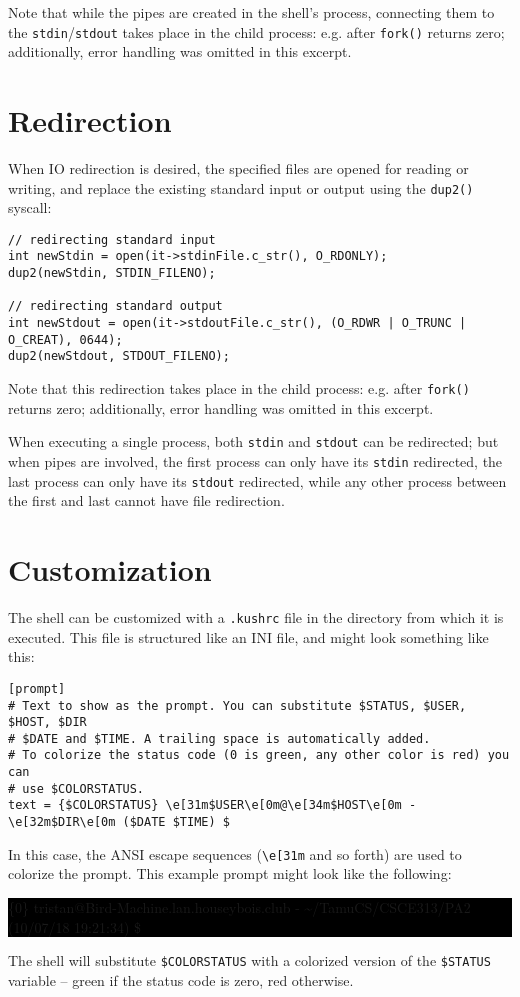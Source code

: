 \documentclass[10pt]{article}
\begin{document}
Note that while the pipes are created in the shell's process, connecting them to the \texttt{stdin}/\texttt{stdout} takes place in the child process: e.g. after \texttt{fork()} returns zero; additionally, error handling was omitted in this excerpt.

\section{Redirection}
When IO redirection is desired, the specified files are opened for reading or writing, and replace the existing standard input or output using the \texttt{dup2()} syscall:

\begin{verbatim}
// redirecting standard input
int newStdin = open(it->stdinFile.c_str(), O_RDONLY);
dup2(newStdin, STDIN_FILENO);

// redirecting standard output
int newStdout = open(it->stdoutFile.c_str(), (O_RDWR | O_TRUNC | O_CREAT), 0644);
dup2(newStdout, STDOUT_FILENO);
\end{verbatim}

Note that this redirection takes place in the child process: e.g. after \texttt{fork()} returns zero; additionally, error handling was omitted in this excerpt.

When executing a single process, both \texttt{stdin} and \texttt{stdout} can be redirected; but when pipes are involved, the first process can only have its \texttt{stdin} redirected, the last process can only have its \texttt{stdout} redirected, while any other process between the first and last cannot have file redirection.

\section{Customization}
The shell can be customized with a \texttt{.kushrc} file in the directory from which it is executed. This file is structured like an INI file, and might look something like this:

\begin{verbatim}
[prompt]
# Text to show as the prompt. You can substitute $STATUS, $USER, $HOST, $DIR
# $DATE and $TIME. A trailing space is automatically added.
# To colorize the status code (0 is green, any other color is red) you can
# use $COLORSTATUS.
text = {$COLORSTATUS} \e[31m$USER\e[0m@\e[34m$HOST\e[0m - \e[32m$DIR\e[0m ($DATE $TIME) $
\end{verbatim}

In this case, the ANSI escape sequences (\texttt{\textbackslash e[31m} and so forth) are used to colorize the prompt. This example prompt might look like the following:

\colorbox{black}{
\color{white}
\tt

\{{\color{green}0}\} {\color{red}tristan}@{\color{cyan}Bird-Machine.lan.houseybois.club} - {\color{green}\textasciitilde /TamuCS/CSCE313/PA2} (10/07/18 19:21:34) \$
}

The shell will substitute \texttt{\$COLORSTATUS} with a colorized version of the \texttt{\$STATUS} variable -- green if the status code is zero, red otherwise.
\end{document}
